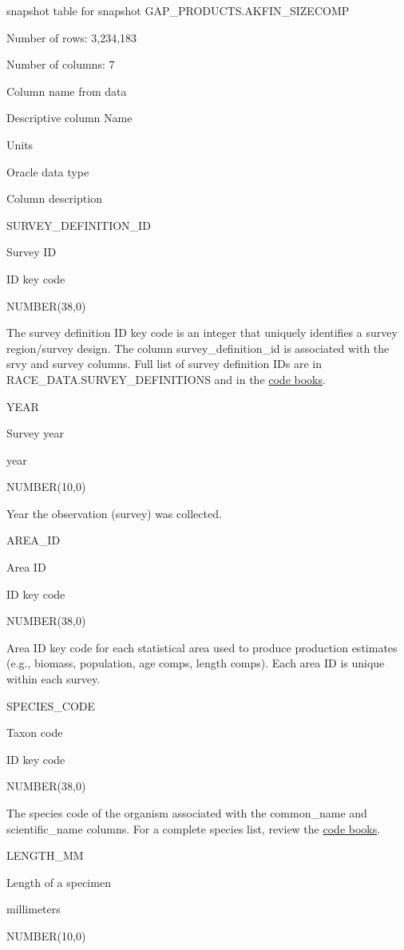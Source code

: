 \documentclass[
  letterpaper,
  oneside,
  open=any]{scrbook}
\begin{document}
snapshot table for snapshot GAP\_PRODUCTS.AKFIN\_SIZECOMP

Number of rows: 3,234,183

Number of columns: 7

Column name from data

Descriptive column Name

Units

Oracle data type

Column description

SURVEY\_DEFINITION\_ID

Survey ID

ID key code

NUMBER(38,0)

The survey definition ID key code is an integer that uniquely identifies
a survey region/survey design. The column survey\_definition\_id is
associated with the srvy and survey columns. Full list of survey
definition IDs are in RACE\_DATA.SURVEY\_DEFINITIONS and in the
\href{https://www.fisheries.noaa.gov/resource/document/groundfish-survey-species-code-manual-and-data-codes-manual}{code
books}.

YEAR

Survey year

year

NUMBER(10,0)

Year the observation (survey) was collected.

AREA\_ID

Area ID

ID key code

NUMBER(38,0)

Area ID key code for each statistical area used to produce production
estimates (e.g., biomass, population, age comps, length comps). Each
area ID is unique within each survey.

SPECIES\_CODE

Taxon code

ID key code

NUMBER(38,0)

The species code of the organism associated with the common\_name and
scientific\_name columns. For a complete species list, review the
\href{https://www.fisheries.noaa.gov/resource/document/groundfish-survey-species-code-manual-and-data-codes-manual}{code
books}.

LENGTH\_MM

Length of a specimen

millimeters

NUMBER(10,0)
\end{document}

